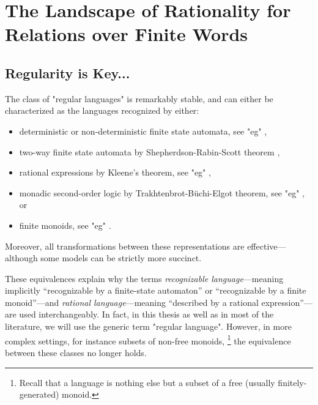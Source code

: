 \section{The Landscape of Rationality for Relations over Finite Words}
\label{sec:preliminaries-automatic-structures-relations}

\subsection{Regularity is Key...}

The class of "regular languages" is remarkably stable, and can either be characterized as the 
languages recognized by either:
\begin{itemize}
	\item deterministic or non-deterministic finite state automata,
	see "eg" \cite[Proposition~1.2.3, p.~7]{Pin2021FiniteAutomata},
	\item two-way finite state automata by Shepherdson-Rabin-Scott theorem
		\cite[Theorem~2, p.~198]{Shepherdson1959ReductionTwoWay}
		\cite[Theorem~15, p.~123]{RabinScott1959FiniteAutomata},
	\item rational expressions by Kleene's theorem,
		see "eg" \cite[Theorem~1.5.11, p.~34]{Pin2021FiniteAutomata},
	\item monadic second-order logic by Trakhtenbrot-Büchi-Elgot theorem,
		see "eg" \cite[Theorem~2.2, p.~32]{Bojanczyk2020MSO}, or
	\item finite monoids,
		see "eg" \cite[\S~1.4.2, p.~19]{Pin2021FiniteAutomata}.
\end{itemize}
Moreover, all transformations between these representations are effective---although some
models can be strictly more succinct.

These equivalences explain why the terms \emph{recognizable language}---meaning implicitly
``recognizable by a finite-state automaton'' or ``recognizable by a finite monoid''---and
\emph{rational language}---meaning ``described by a rational expression''---are used 
interchangeably. In fact, in this thesis as well as in most of the literature,
we will use the generic term "regular language".
However, in more complex settings, for instance subsets of non-free monoids,%
\footnote{Recall that a language is nothing else but a subset of a free
(usually finitely-generated) monoid.}
the equivalence between these classes no longer holds. \cite{Pin2021StackExchange}

